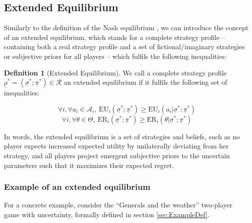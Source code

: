 \documentclass{article}
\theoremstyle{definition}
\newtheorem{definition}{Definition}[section]
\begin{document}
\subsection{Extended Equilibrium}

Similarly to the definition of the Nash equilibrium \cite{paper:Nash1951,book:GameTheory}, we can introduce the concept of an extended equilibrium, which stands for a complete strategy profile -- containing both a real strategy profile and a set of fictional/imaginary strategies or subjective priors for all players -- which fulfils the following inequalities:

\begin{definition}[Extended Equilibrium]
\label{def:ExEq}
We call a complete strategy profile $\underline{\rho}^* = (\underline{\sigma}^*;\underline{\pi}^*) \in \mathcal{R}$ an extended equilibrium if it fulfils the following set of inequalities:

    \begin{equation}
    \label{defeq:ExtendedEquilibriumEU}
        \forall i, \forall a_i \in \mathcal{A}_i, \  \mathrm{EU}_i(\underline{\sigma}^*;\underline{\pi}^*) \ge \mathrm{EU}_i(a_i | \underline{\sigma}^*;\underline{\pi}^*)
    \end{equation}
    \begin{equation}
    \label{defeq:ExtendedEquilibriumER}
        \forall i, \forall \theta \in \Theta, \  \mathrm{ER}_i(\underline{\sigma}^*;\underline{\pi}^*) \ge \mathrm{ER}_i(\theta | \underline{\sigma}^*;\underline{\pi}^*)
    \end{equation}

\end{definition}

In words, the extended equilibrium is a set of strategies and beliefs, such as no player expects increased expected utility by unilaterally deviating from her strategy, and all players project emergent subjective priors to the uncertain parameters such that it maximizes their expected regret.

\subsubsection{Example of an extended equilibrium}

For a concrete example, consider the ``Generals and the weather'' two-player game with uncertainty, formally defined in section \ref{sec:ExampleDef}.
\end{document}
